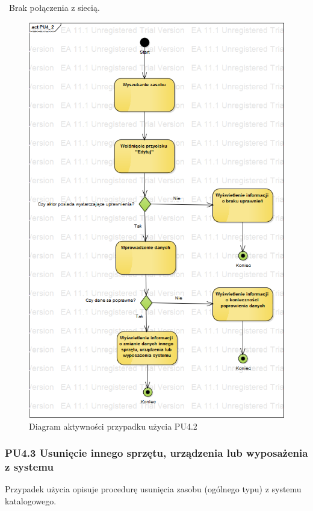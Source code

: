 \
Brak połączenia z siecią.

\begin{figure}[h!]
	\centering
	\includegraphics[scale=0.6]{img/diagrams/activityDiagrams/PU4_2}
	\caption{Diagram aktywności przypadku użycia PU4.2 \label{fig:labelADPU4.2}}
\end{figure}

\subsubsection{PU4.3 Usunięcie innego sprzętu, urządzenia lub wyposażenia z systemu}

Przypadek użycia opisuje procedurę usunięcia zasobu (ogólnego typu) z systemu katalogowego.

